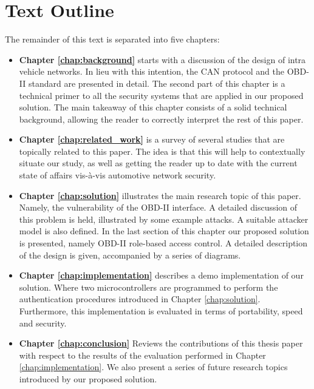 \section{Text Outline}
The remainder of this text is separated into five chapters:
\begin{itemize}
	\item \textbf{Chapter \ref{chap:background}} starts with a discussion of the design of intra vehicle networks. In lieu with this intention, the CAN protocol and the OBD-II standard are presented in detail. The second part of this chapter is a technical primer to all the security systems that are applied in our proposed solution. The main takeaway of this chapter consists of a solid technical background, allowing the reader to correctly interpret the rest of this paper.
	
	\item \textbf{Chapter \ref{chap:related_work}} is a survey of several studies that are topically related to this paper. The idea is that this will help to contextually situate our study, as well as getting the reader up to date with the current state of affairs vis-\`a-vis automotive network security.
	
	\item \textbf{Chapter \ref{chap:solution}} illustrates the main research topic of this paper. Namely, the vulnerability of the OBD-II interface. A detailed discussion of this problem is held, illustrated by some example attacks. A suitable attacker model is also defined. In the last section of this chapter our proposed solution is presented, namely OBD-II role-based access control. A detailed description of the design is given, accompanied by a series of diagrams.
	
	\item \textbf{Chapter \ref{chap:implementation}} describes a demo implementation of our solution. Where two microcontrollers are programmed to perform the authentication procedures introduced in Chapter \ref{chap:solution}. Furthermore, this implementation is evaluated in terms of portability, speed and security.
	
	\item \textbf{Chapter \ref{chap:conclusion}} Reviews the contributions of this thesis paper with respect to the results of the evaluation performed in Chapter \ref{chap:implementation}. We also present a series of future research topics introduced by our proposed solution.
\end{itemize}